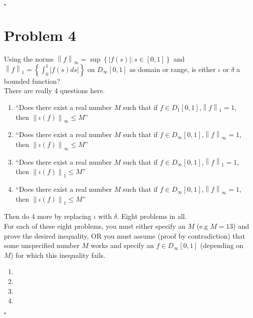 \documentclass[11pt]{article}
\newcommand{\set}[1]{\left\{ #1\right\}}
\newcommand{\norm}[1]{\left\lVert#1\right\rVert}
\newenvironment{proof}{\noindent{\bf Proof.}}{\hfill $\square$\medskip}
\begin{document}
\begin{proof}
    
\end{proof}

\section{Problem 4}
Using the norms $\norm{f}_{\infty}=\sup\set{|f(s)|:s\in[0,1]}$ and $\norm{f}_{1}=\set{\int_{0}^{1}|f(s)ds|}$ on 
$D_{\infty}[0,1]$ as domain or range, is either $\iota$ or $\delta$ a bounded function?\\
There are really 4 questions here.
\begin{enumerate}[label=\textbf{(\alph*)}]
    \item ``Does there exist a real number $M$ such that if $f\in D_{1}[0,1]$,$\norm{f}_{1}=1$, then 
    $\norm{\iota(f)}_{\infty}\leq M$''
    \item ``Does there exist a real number $M$ such that if $f\in D_{\infty}[0,1]$,$\norm{f}_{\infty}=1$, then 
    $\norm{\iota(f)}_{\infty}\leq M$''
    \item ``Does there exist a real number $M$ such that if $f\in D_{\infty}[0,1]$,$\norm{f}_{1}=1$, then 
    $\norm{\iota(f)}_{1}\leq M$''
    \item ``Does there exist a real number $M$ such that if $f\in D_{\infty}[0,1]$,$\norm{f}_{\infty}=1$, then 
    $\norm{\iota(f)}_{1}\leq M$''
\end{enumerate}
Then do 4 more by replacing $\iota$ with $\delta$. Eight problems in all.\\
For each of these eight problems, you must either specify an $M$ (e.g $M=13$) and prove the desired inequality, OR
you must assume (proof by contradiction) that some unspecified number $M$ works and specify an $f\in D_{\infty}[0,1]$
(depending on $M$) for which this inequality fails.

\begin{proof}
    \begin{enumerate}[label=\textbf{(\alph*)}]
        \item
        \item 
        \item 
        \item 
    \end{enumerate}
\end{proof}
\end{document}
